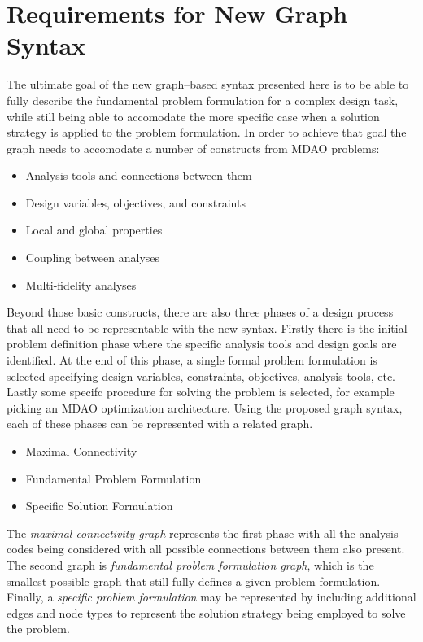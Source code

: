 \section{Requirements for New Graph Syntax}
The ultimate goal of the new graph--based syntax presented here is to be able to 
fully describe the fundamental problem formulation for a complex design task, 
while still being able to accomodate the more specific case when a solution 
strategy is applied to the problem formulation. In order to achieve that goal 
the graph needs to accomodate a number of constructs from MDAO problems: 

\begin{itemize}
    \item Analysis tools and connections between them
    \item Design variables, objectives, and constraints
    \item Local and global properties
    \item Coupling between analyses
    \item Multi-fidelity analyses
\end{itemize}

Beyond those basic constructs, there are also three phases of a design process that 
all need to be representable with the new syntax. Firstly there is the initial problem definition
phase where the specific analysis tools and design goals are identified. At the end of this phase, 
a single formal problem formulation is selected specifying design variables, constraints, objectives, 
analysis tools, etc. Lastly some specifc procedure for solving the problem is selected, for example 
picking an MDAO optimization architecture. Using the proposed graph syntax, each of these phases 
can be represented with a related graph. 

\begin{itemize}
    \item Maximal Connectivity
    \item Fundamental Problem Formulation 
    \item Specific Solution Formulation
\end{itemize}

The \emph{maximal connectivity graph} represents the first phase with all the 
analysis codes being considered with all possible connections between them also present. The second graph 
is \emph{fundamental problem formulation graph}, which is the smallest possible graph 
that still fully defines a given problem formulation. Finally, a \emph{specific problem formulation} 
may be represented by including additional edges and node types to represent the 
solution strategy being employed to solve the problem. 

